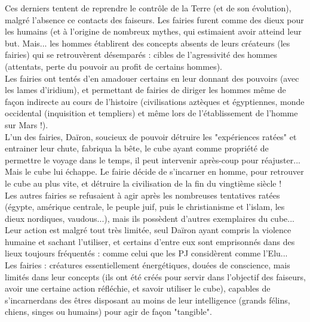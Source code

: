 \documentclass[11pt,twoside,a4paper]{book}
\begin{document}
Ces derniers tentent de reprendre le contr{\^o}le de la Terre (et de son {\'e}volution), malgr{\'e} l'absence ce contacts des faiseurs. Les fairies furent comme des dieux pour les humains (et {\`a} l'origine de nombreux mythes, qui estimaient avoir atteind leur but. Mais... les hommes {\'e}tablirent des concepts absents de leurs cr{\'e}ateurs (les fairies) qui se retrouv{\`e}rent d{\'e}sempar{\'e}s : cibles de l'agressivit{\'e} des hommes (attentats, perte du pouvoir au profit de certains hommes). ~\\

Les fairies ont tent{\'e}s d'en amadouer certains en leur donnant des pouvoirs (avec les lames d'iridium), et permettant de fairies de diriger les hommes m{\^e}me de fa\c{c}on indirecte au cours de l'histoire (civilisations azt{\`e}ques et {\'e}gyptiennes, monde occidental (inquisition et templiers) et m{\^e}me lors de l'{\'e}tablissement de l'homme sur Mars !). ~\\

L'un des fairies, Da{\"i}ron, soucieux de pouvoir d{\'e}truire les "exp{\'e}riences rat{\'e}es" et entrainer leur chute, fabriqua la b{\^e}te, le cube ayant comme propri{\'e}t{\'e} de permettre le voyage dans le temps, il peut intervenir apr{\`e}s-coup pour r{\'e}ajuster... Mais le cube lui {\'e}chappe. Le fairie d{\'e}cide de s'incarner en homme, pour retrouver le cube au plus vite, et d{\'e}truire la civilisation de la fin du vingti{\`e}me si{\`e}cle ! ~\\

Les autres fairies se refusaient {\`a} agir apr{\`e}s les nombreuses tentatives rat{\'e}es ({\'e}gypte, am{\'e}rique centrale, le peuple juif, puis le christianisme et l'islam, les dieux nordiques, vaudous...), mais ils poss{\`e}dent d'autres exemplaires du cube... Leur action est malgr{\'e} tout tr{\`e}s limit{\'e}e, seul Da{\"i}ron ayant compris la violence humaine et sachant l'utiliser, et certains d'entre eux sont emprisonn{\'e}s dans des lieux toujours fr{\'e}quent{\'e}s : comme celui que les PJ consid{\`e}rent comme l'Elu... ~\\

Les fairies : cr{\'e}atures essentiellement {\'e}nerg{\'e}tiques, dou{\'e}es de conscience, mais limit{\'e}s dans leur concepts (ils ont {\'e}t{\'e} cr{\'e}{\'e}s pour servir dans l'objectif des faiseurs, avoir une certaine action r{\'e}fl{\'e}chie, et savoir utiliser le cube), capables de s'incarnerdans des {\^e}tres disposant au moins de leur intelligence (grands f{\'e}lins, chiens, singes ou humains) pour agir de fa\c{c}on "tangible". ~\\
\end{document}
